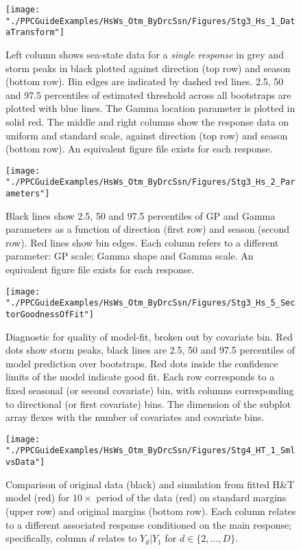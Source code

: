\begin{figure}
	\centering
	\texttt{[image: "./PPCGuideExamples/HsWs\_Otm\_ByDrcSsn/Figures/Stg3\_Hs\_1\_DataTransform"]}
	\caption{Left column shows sea-state data for a \emph{single response} in grey and storm peaks in black plotted against direction (top row) and season (bottom row). Bin edges are indicated by dashed red lines. 2.5, 50 and 97.5 percentiles of estimated threshold across all bootstraps are plotted with blue lines. The Gamma location parameter is plotted in solid red. The middle and right columns show the response data on uniform and standard scale, against direction (top row) and season (bottom row). An equivalent figure file exists for each response. }
	\label{fig:Ex_Stg3a}
\end{figure}
\begin{figure}
	\centering
	\texttt{[image: "./PPCGuideExamples/HsWs\_Otm\_ByDrcSsn/Figures/Stg3\_Hs\_2\_Parameters"]}
	\caption{Black lines show  2.5, 50 and 97.5 percentiles of GP and Gamma parameters as a function of direction (first row) and season (second row). Red lines show bin edges. Each column refers to a different parameter: GP scale; Gamma shape and Gamma scale. An equivalent figure file exists for each response.}
	\label{fig:Ex_Stg3b}
\end{figure}
\begin{figure}
	\centering
		\texttt{[image: "./PPCGuideExamples/HsWs\_Otm\_ByDrcSsn/Figures/Stg3\_Hs\_5\_SectorGoodnessOfFit"]}
		
			\caption{Diagnostic for quality of model-fit, broken out by covariate bin. Red dots show storm peaks, black lines are 2.5, 50 and 97.5 percentiles of model prediction over bootstraps. Red dots inside the confidence limits of the model indicate good fit. Each row corresponds to a fixed seasonal (or second covariate) bin, with columns corresponding to directional (or first covariate) bins. The dimension of the subplot array flexes with the number of covariates and covariate bins. }
	
		\label{fig:Ex_Stg3c}
	\end{figure}

\begin{figure}
	\centering
	\texttt{[image: "./PPCGuideExamples/HsWs\_Otm\_ByDrcSsn/Figures/Stg4\_HT\_1\_SmlvsData"]}
	\caption{Comparison of original data (black) and simulation from fitted H\&T model (red) for $10 \times$ period of the data (red) on standard margins (upper row) and original margins (bottom row). Each column relates to a different associated response conditioned on the main response; specifically, column $d$ relates to $Y_d | Y_1$ for $d \in \{2,...,D\}$. }
	\label{fig:Ex_Stg4a}
\end{figure}

